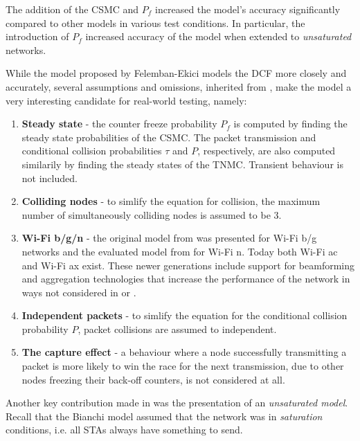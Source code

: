 The addition of the CSMC and $P_f$ increased the model's accuracy significantly
compared to other models in various test conditions. In particular, the
introduction of $P_f$ increased accuracy of the model when extended to
\emph{unsaturated} networks.

While the model proposed by Felemban-Ekici models the DCF more closely and
accurately, several assumptions and omissions, inherited from \cite{bianchi},
make the model a very interesting candidate for real-world testing, namely:

\begin{enumerate}

	\item \textbf{Steady state} - the counter freeze probability $P_f$ is
	computed by finding the steady state probabilities of the CSMC. The packet
	transmission and conditional collision probabilities $\tau$ and $P$,
	respectively, are also computed similarily by finding the steady states of
	the TNMC. Transient behaviour is not included.

	\item \textbf{Colliding nodes} - to simlify the equation for collision,
	the maximum number of simultaneously colliding nodes is assumed to be 3.

	\item \textbf{Wi-Fi b/g/n} - the original model from \cite{bianchi} was
	presented for Wi-Fi b/g networks and the evaluated model from \cite{felemban}
	for Wi-Fi n. Today both Wi-Fi ac and Wi-Fi ax exist. These newer generations
	include support for beamforming and aggregation technologies that increase
	the performance of the network in ways not considered in \cite{bianchi} or
	\cite{felemban}.

	\item \textbf{Independent packets} - to simlify the equation for the
	conditional collision probability $P$, packet collisions are assumed to
	independent.

	\item \textbf{The capture effect} - a behaviour where a node successfully
	transmitting a packet is more likely to win the race for the next transmission,
	due to other nodes freezing their back-off counters, is not considered at all.

\end{enumerate}

Another key contribution made in \cite{felemban} was the presentation of an
\emph{unsaturated model}. Recall that the Bianchi model assumed that the
network was in \emph{saturation} conditions, i.e. all STAs always have
something to send.

